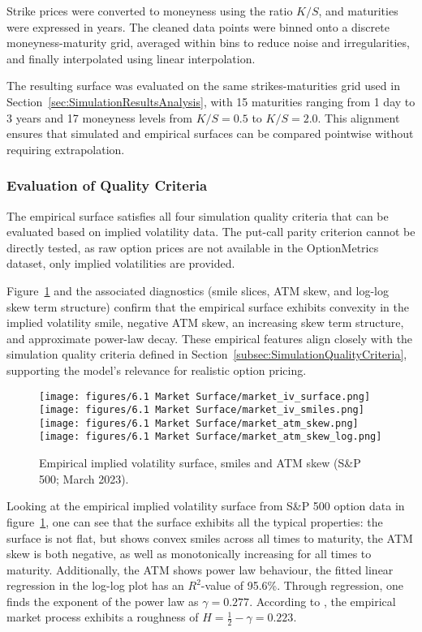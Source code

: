 Strike prices were converted to moneyness using the ratio $K/S$, and maturities were expressed in years. The cleaned data points were binned onto a discrete moneyness-maturity grid, averaged within bins to reduce noise and irregularities, and finally interpolated using linear interpolation.

The resulting surface was evaluated on the same strikes-maturities grid used in Section~\ref{sec:SimulationResultsAnalysis}, with 15 maturities ranging from 1 day to 3 years and 17 moneyness levels from $K/S = 0.5$ to $K/S = 2.0$. This alignment ensures that simulated and empirical surfaces can be compared pointwise without requiring extrapolation.


\subsubsection*{Evaluation of Quality Criteria}
The empirical surface satisfies all four simulation quality criteria that can be evaluated based on implied volatility data. The put-call parity criterion cannot be directly tested, as raw option prices are not available in the OptionMetrics dataset, only implied volatilities are provided.

Figure~\ref{fig:MarketSurface} and the associated diagnostics (smile slices, ATM skew, and log-log skew term structure) confirm that the empirical surface exhibits convexity in the implied volatility smile, negative ATM skew, an increasing skew term structure, and approximate power-law decay. These empirical features align closely with the simulation quality criteria defined in Section~\ref{subsec:SimulationQualityCriteria}, supporting the model's relevance for realistic option pricing.

\begin{figure}[H]
    \centering
    \texttt{[image: figures/6.1 Market Surface/market\_iv\_surface.png]}
    \texttt{[image: figures/6.1 Market Surface/market\_iv\_smiles.png]}
    \texttt{[image: figures/6.1 Market Surface/market\_atm\_skew.png]}
    \texttt{[image: figures/6.1 Market Surface/market\_atm\_skew\_log.png]}
    \caption{Empirical implied volatility surface, smiles and ATM skew (S\&P 500; March 2023).}
    \label{fig:MarketSurface}
\end{figure}

Looking at the empirical implied volatility surface from S\&P 500 option data in figure~\ref{fig:MarketSurface}, one can see that the surface exhibits all the typical properties: the surface is not flat, but shows convex smiles across all times to maturity, the ATM skew is both negative, as well as monotonically increasing for all times to maturity. Additionally, the ATM shows power law behaviour, the fitted linear regression in the log-log plot has an $R^2$-value of 95.6\%. Through regression, one finds the exponent of the power law as $\gamma = 0.277$. According to \cite{Fukasawa2011}, the empirical market process exhibits a roughness of $H = \tfrac{1}{2} - \gamma = 0.223$.


